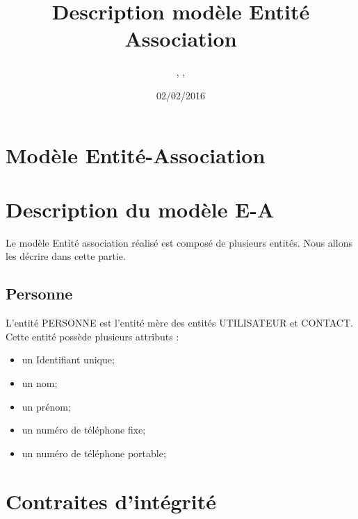 \documentclass[asi, sansVersion]{picINSA}
\begin{document}
\title{Description modèle Entité Association}
\author{\Florian, \Mathieu, \Julie}
\date{02/02/2016} 

\maketitle

\tableofcontents

\section{Modèle Entité-Association}


\section{Description du modèle E-A}

Le modèle Entité association réalisé est composé de plusieurs entités. Nous allons les décrire dans cette partie. \\ 

\subsection{Personne}

L'entité PERSONNE est l'entité mère des entités UTILISATEUR et CONTACT. \\
Cette entité possède plusieurs attributs : 
\begin{itemize}
\item un Identifiant unique;
\item un nom; %
\item un prénom; %
\item un numéro de téléphone fixe; %
\item un numéro de téléphone portable; %
\end{itemize}

\section{Contraites d'intégrité}
\end{document}
